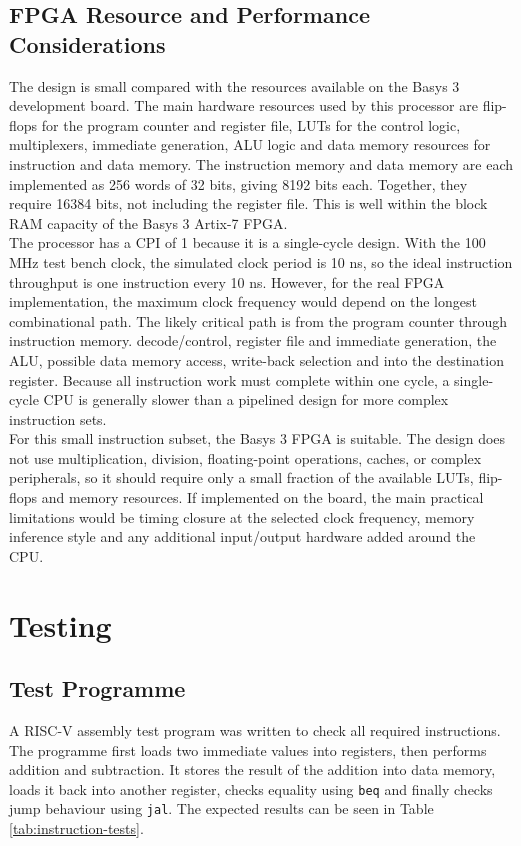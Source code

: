 \documentclass[12pt,a4paper]{article}
\begin{document}
\subsection{FPGA Resource and Performance Considerations}
The design is small compared with the resources available on the Basys 3 development board. The main hardware resources used by this processor are flip-flops for the program counter and register file, LUTs for the control logic, multiplexers, immediate generation, ALU logic and data memory resources for instruction and data memory. The instruction memory and data memory are each implemented as 256 words of 32 bits, giving 8192 bits each. Together, they require 16384 bits, not including the register file. This is well within the block RAM capacity of the Basys 3 Artix-7 FPGA.\\
The processor has a CPI of 1 because it is a single-cycle design. With the 100 MHz test bench clock, the simulated clock period is 10 ns, so the ideal instruction throughput is one instruction every 10 ns. However, for the real FPGA implementation, the maximum clock frequency would depend on the longest combinational path. The likely critical path is from the program counter through instruction memory. decode/control, register file and immediate generation, the ALU, possible data memory access, write-back selection and into the destination register. Because all instruction work must complete within one cycle, a single-cycle CPU is generally slower than a pipelined design for more complex instruction sets.\\
For this small instruction subset, the Basys 3 FPGA is suitable. The design does not use multiplication, division, floating-point operations, caches, or complex peripherals, so it should require only a small fraction of the available LUTs, flip-flops and memory resources. If implemented on the board, the main practical limitations would be timing closure at the selected clock frequency, memory inference style and any additional input/output hardware added around the CPU.

\section{Testing}
\subsection{Test Programme}
A RISC-V assembly test program was written to check all required instructions. The programme first loads two immediate values into registers, then performs addition and subtraction. It stores the result of the addition into data memory, loads it back into another register, checks equality using \texttt{beq} and finally checks jump behaviour using \texttt{jal}. The expected results can be seen in Table \ref{tab:instruction-tests}.\\
\end{document}
